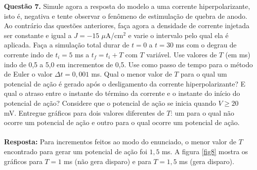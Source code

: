 \documentclass[english,11pt,a4paper]{article}
\begin{document}
	
	\noindent \textbf{Questão 7.} Simule agora a resposta do modelo a uma corrente hiperpolarizante, isto é, negativa e tente observar o fenômeno de estimulação de quebra de anodo. Ao contrário das questões anteriores, faça agora a densidade de corrente injetada ser constante e igual a $J = -15$ $\mu$A/cm$^2$ e varie o intervalo pelo qual ela é aplicada. Faça a simulação total durar de $t = 0$ a $t = 30$ ms com o degrau de corrente indo de $t_i = 5$ ms a $t_f = t_i + T$ com $T$ variável. Use valores de $T$ (em ms) indo de 0,5 a 5,0 em incrementos de 0,5. Use como passo de tempo para o método de Euler o valor $\Delta t = 0{,}001$ ms. Qual o menor valor de $T$ para o qual um potencial de ação é gerado após o desligamento da corrente hiperpolarizante? E qual o atraso entre o instante do término da corrente e o instante do início do potencial de ação? Considere que o potencial de ação se inicia quando $V \geq 20$ mV. Entregue gráficos para dois valores diferentes de $T$: um para o qual não ocorre um potencial de ação e outro para o qual ocorre um potencial de ação.\\\\
	
	\noindent\textbf{Resposta:} Para incrementos feitos ao modo do enunciado, o menor valor de $T$ encontrado para gerar um potencial de ação foi $1,5$ ms. A figura \ref{fig8} mostra os gráficos para $T = 1$ ms (não gera disparo) e para $T =  1,5$ ms (gera disparo).
	
\end{document}
